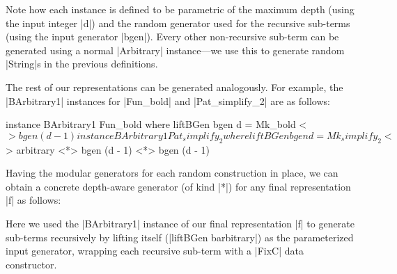 Note how each instance is defined to be parametric of the maximum depth (using
the input integer |d|) and the random generator used for the recursive sub-terms
(using the input generator |bgen|).
%
Every other non-recursive sub-term can be generated using a normal |Arbitrary|
instance---we use this to generate random |String|s in the previous definitions.


The rest of our representations can be generated analogously.
%
For example, the |BArbitrary1| instances for |Fun_bold| and |Pat_simplify_2| are
as follows:

\begin{code}
instance BArbitrary1 Fun_bold where
  liftBGen bgen d = Mk_bold <$> bgen (d - 1)

instance BArbitrary1 Pat_simplify_2 where
  liftBGen bgen d = Mk_simplify_2
    <$> arbitrary <*> bgen (d - 1) <*> bgen (d - 1)
\end{code} %







Having the modular generators for each random construction in place, we can
obtain a concrete depth-aware generator (of kind |*|) for any final
representation |f| as follows:

%
Here we used the |BArbitrary1| instance of our final representation |f| to
generate sub-terms recursively by lifting itself (|liftBGen barbitrary|) as the
parameterized input generator, wrapping each recursive sub-term with a |FixC|
data constructor.

